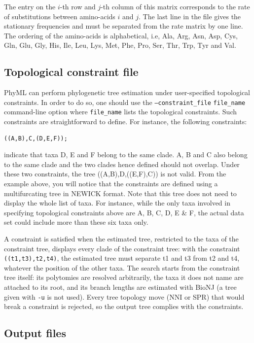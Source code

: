 \documentclass[a4paper,12pt]{article}
\newcommand{\x}[1]{\texttt{#1}}
\begin{document}
The  entry  on the  $i$-th  row  and  $j$-th  column of  this  matrix  corresponds  to the  rate  of
substitutions between  amino-acids $i$  and $j$.   The last line  in the  file gives  the stationary
frequencies and must be separated from the rate  matrix by one line. The ordering of the amino-acids
is alphabetical,  i.e, Ala, Arg, Asn, Asp,  Cys, Gln, Glu, Gly,  His, Ile, Leu, Lys,  Met, Phe, Pro,
Ser, Thr, Trp, Tyr and Val.


\subsection{Topological constraint file}\label{sec:topoconstraints}

PhyML can perform phylogenetic tree estimation under user-specified topological constraints. In
order to do so, one should use the \x{--constraint\_file}  \x{file\_name} command-line option where
\x{file\_name} lists the topological constraints. Such constraints are  straightforward to
define. For instance, the following constraints:
\vspace{0.2cm}
\begin{Verbatim}
((A,B),C,(D,E,F));
\end{Verbatim}
indicate that taxa D, E and F belong to the same clade. A, B and C also belong to the
same  clade and the  two clades  hence defined  should not  overlap. Under  these two
constraints, the tree ((A,B),D,((E,F),C)) is not valid. From the example above, you will notice that
the constraints are defined  using a multifurcating tree in NEWICK format.  Note that this tree does
not need to display the whole list of taxa. For instance, while the only taxa involved in specifying
topological constraints above  are A, B, C, D, E  \& F, the actual data set  could include more than
these six taxa only.

A constraint is satisfied when the estimated tree, restricted to the taxa of the constraint tree,
displays every clade of the constraint tree: with the constraint \x{((t1,t3),t2,t4)}, the estimated
tree must separate t1 and t3 from t2 and t4, whatever the position of the other taxa. The search
starts from the constraint tree itself: its polytomies are resolved arbitrarily, the taxa it does
not name are attached to its root, and its branch lengths are estimated with BioNJ (a tree given
with \x{-u} is not used). Every tree topology move (NNI or SPR) that would break a constraint is
rejected, so the output tree complies with the constraints.


\subsection{Output files}
\end{document}
